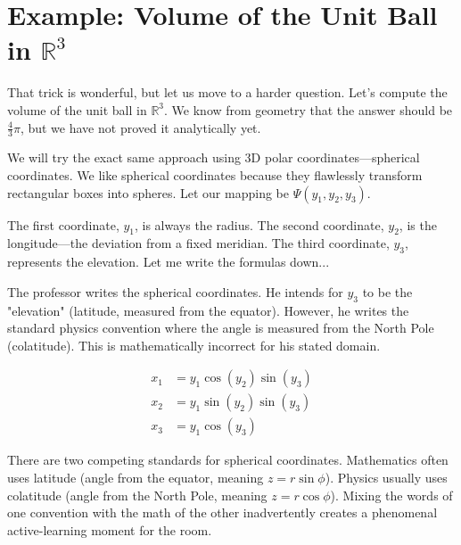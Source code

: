 \section{Example: Volume of the Unit Ball in $\mathbb{R}^3$}

\begin{spoken_clean}[00:26:33 - 00:32:00]
That trick is wonderful, but let us move to a harder question. Let's compute the volume of the unit ball in $\mathbb{R}^3$. We know from geometry that the answer should be $\frac{4}{3}\pi$, but we have not proved it analytically yet.

We will try the exact same approach using 3D polar coordinates—spherical coordinates. We like spherical coordinates because they flawlessly transform rectangular boxes into spheres. Let our mapping be $\Psi(y_1, y_2, y_3)$. 

The first coordinate, $y_1$, is always the radius. The second coordinate, $y_2$, is the longitude—the deviation from a fixed meridian. The third coordinate, $y_3$, represents the elevation. Let me write the formulas down...
\end{spoken_clean}

\begin{nice-box}
The professor writes the spherical coordinates. He intends for $y_3$ to be the "elevation" (latitude, measured from the equator). However, he writes the standard physics convention where the angle is measured from the North Pole (colatitude). This is mathematically incorrect for his stated domain.
\end{nice-box}

\begin{math_stroke}
\begin{align} 
x_1 &= y_1 \cos(y_2) \sin(y_3) \nonumber \\
x_2 &= y_1 \sin(y_2) \sin(y_3) \label{eq:wrong_spherical} \\
x_3 &= y_1 \cos(y_3) \nonumber
\end{align}
\end{math_stroke}

\begin{didactic_insight}
There are two competing standards for spherical coordinates. Mathematics often uses latitude (angle from the equator, meaning $z = r\sin\phi$). Physics usually uses colatitude (angle from the North Pole, meaning $z = r\cos\phi$). Mixing the words of one convention with the math of the other inadvertently creates a phenomenal active-learning moment for the room.
\end{didactic_insight}

